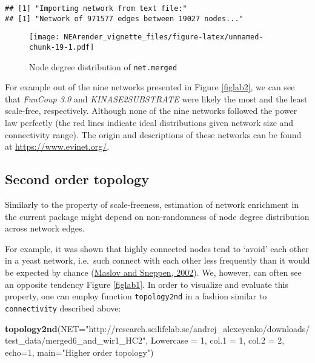 \documentclass[]{article}
\newenvironment{Shaded}{\begin{snugshade}}{\end{snugshade}}
\newcommand{\KeywordTok}[1]{\textcolor[rgb]{0.13,0.29,0.53}{\textbf{#1}}}
\newcommand{\DataTypeTok}[1]{\textcolor[rgb]{0.13,0.29,0.53}{#1}}
\newcommand{\DecValTok}[1]{\textcolor[rgb]{0.00,0.00,0.81}{#1}}
\newcommand{\StringTok}[1]{\textcolor[rgb]{0.31,0.60,0.02}{#1}}
\newcommand{\NormalTok}[1]{#1}
\begin{document}
\begin{verbatim}
## [1] "Importing network from text file:"
## [1] "Network of 971577 edges between 19027 nodes..."
\end{verbatim}

\begin{figure}
\centering
\texttt{[image: NEArender\_vignette\_files/figure-latex/unnamed-chunk-19-1.pdf]}
\caption{Node degree distribution of \texttt{net.merged}}
\end{figure}

For example out of the nine networks presented in Figure \ref{figlab2},
we can see that \emph{FunCoup 3.0} and \emph{KINASE2SUBSTRATE} were
likely the most and the least scale-free, respectively. Although none of
the nine networks followed the power law perfectly (the red lines
indicate ideal distributions given network size and connectivity range).
The origin and descriptions of these networks can be found at
\url{https://www.evinet.org/}.

\hypertarget{sot}{\subsection{Second order topology}\label{sot}}

Similarly to the property of scale-freeness, estimation of network
enrichment in the current package might depend on non-randomness of node
degree distribution across network edges.

For example, it was shown that highly connected nodes tend to `avoid'
each other in a yeast network, i.e.~such connect with each other less
frequently than it would be expected by chance
(\href{http://www.ncbi.nlm.nih.gov/pubmed/11988575}{Maslov and Sneppen,
2002}). We, however, can often see an opposite tendency Figure
\ref{figlab1}. In order to visualize and evaluate this property, one can
employ function \texttt{topology2nd} in a fashion similar to
\texttt{connectivity} described above:

\begin{Shaded}
\begin{Highlighting}[]
\KeywordTok{topology2nd}\NormalTok{(}\DataTypeTok{NET=}\StringTok{"http://research.scilifelab.se/andrej_alexeyenko/downloads/test_data/merged6_and_wir1_HC2"}\NormalTok{, }\DataTypeTok{Lowercase =} \DecValTok{1}\NormalTok{, }\DataTypeTok{col.1 =} \DecValTok{1}\NormalTok{, }\DataTypeTok{col.2 =} \DecValTok{2}\NormalTok{, }\DataTypeTok{echo=}\DecValTok{1}\NormalTok{, }\DataTypeTok{main=}\StringTok{"Higher order topology"}\NormalTok{)}
\end{Highlighting}
\end{Shaded}
\end{document}

